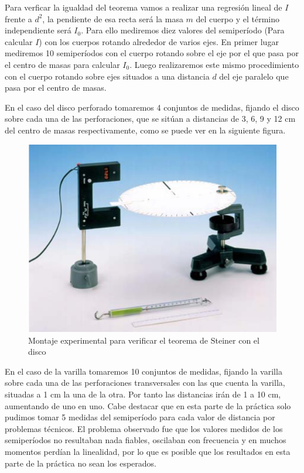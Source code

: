\documentclass[a4paper,12pt,titlepage]{article}
\begin{document}
\par Para verficar la igualdad del teorema vamos a realizar una regresión lineal de $I$ frente a $d^2$, la pendiente de esa recta será la masa $m$ del cuerpo y el término independiente será $I_0$. Para ello mediremos diez valores del semiperíodo (Para calcular $I$) con los cuerpos rotando alrededor de varios ejes. En primer lugar mediremos 10 semiperíodos con el cuerpo rotando sobre el eje por el que pasa por el centro de masas para calcular $I_0$. Luego realizaremos este mismo procedimiento con el cuerpo rotando sobre ejes situados a una distancia $d$ del eje paralelo que pasa por el centro de masas.

\par En el caso del disco perforado tomaremos 4 conjuntos de medidas, fijando el disco sobre cada una de las perforaciones, que se sitúan a distancias de 3, 6, 9 y 12 cm del centro de masas respectivamente, como se puede ver en la siguiente figura.

\begin{figure}[h!]
    \centering
    \includegraphics[width=0.65\linewidth]{Images/Material MI 2.jpeg}
    \caption{Montaje experimental para verificar el teorema de Steiner con el disco}
\end{figure}

\newpage

\par En el caso de la varilla tomaremos 10 conjuntos de medidas, fijando la varilla sobre cada una de las perforaciones transversales con las que cuenta la varilla, situadas a 1 cm la una de la otra. Por tanto las distancias irán de 1 a 10 cm, aumentando de uno en uno. Cabe destacar que en esta parte de la práctica solo pudimos tomar 5 medidas del semiperíodo para cada valor de distancia por problemas técnicos. El problema observado fue que los valores medidos de los semiperíodos no resultaban nada fiables, oscilaban con frecuencia y en muchos momentos perdían la linealidad, por lo que es posible que los resultados en esta parte de la práctica no sean los esperados.
\end{document}
